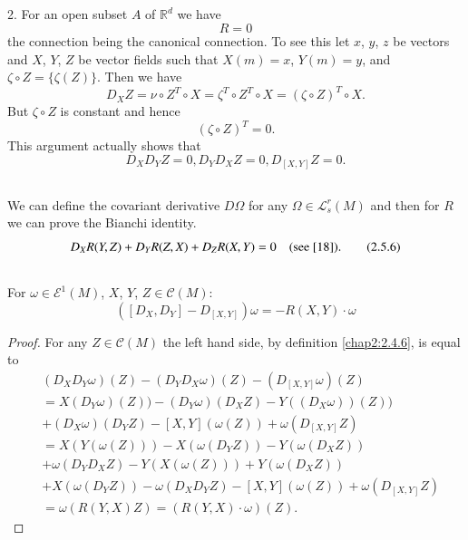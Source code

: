 \subsection{}\label{chap2:2.5.4} 
2. For an open subset $A$ of $\mathbb{R}^{d}$ we have 
$$
R=0
$$
the \pageoriginale connection being the canonical connection. To see
this let $x$, $y$, $z$ be vectors and $X$, $Y$, $Z$ be vector fields
such that $X(m)=x$, $Y(m)=y$, and $\zeta\circ Z=\{\zeta(Z)\}$. Then we
have
$$
D_{X}Z=\nu \circ Z^{T}\circ X=\zeta^{T}\circ Z^{T}\circ X=(\zeta\circ
Z)^{T}\circ X.
$$
But $\zeta\circ Z$ is constant and hence
$$
(\zeta\circ Z)^{T}=0.
$$
This argument actually shows that
$$
D_{X}D_{Y}Z=0, D_{Y}D_{X}Z=0, D_{[X,Y]}Z=0.
$$


\setcounter{subsection}{4}
\subsection{}\label{chap2:2.5.5}

\begin{note*}
We can define the covariant derivative $D\Omega$ for any
$\Omega\in\mathscr{L}^{r}_{s}(M)$ and then for $R$ we can prove the
Bianchi identity.
\begin{equation*}
D_{X}R(Y,Z)+D_{Y}R(Z,X)+D_{Z}R(X,Y)=0\quad\text{(see
  \cite{18}).}\tag{2.5.6}\label{chap2:2.5.6} 
\end{equation*}
\end{note*}

\setcounter{subsection}{6}
\subsection{}\label{chap2:2.5.7}

\begin{lemma*}
For $\omega\in \mathscr{E}^{1}(M)$, $X$, $Y$, $Z\in \mathscr{C}(M)$:
$$
([D_{X},D_{Y}]-D_{[X,Y]})\omega=-R(X,Y)\cdot \omega
$$
\end{lemma*}

\begin{proof}
For any $Z\in \mathscr{C}(M)$ the left hand side, by definition
\ref{chap2:2.4.6}, is equal to
\begin{align*}
& (D_{X}D_{Y}\omega)(Z)-(D_{Y}D_{X}\omega)(Z)-(D_{[X,Y]}\omega)(Z)\\
& =X(D_{Y}\omega)(Z))-(D_{Y}\omega)(D_{X}Z)-Y((D_{X}\omega))(Z))\\
& +(D_{X}\omega)(D_{Y}Z)-[X,Y](\omega(Z))+\omega(D_{[X,Y]}Z)\\
& =X(Y(\omega(Z)))-X(\omega(D_{Y}Z))-Y(\omega(D_{X}Z))\\
& +\omega(D_{Y}D_{X}Z)-Y(X(\omega(Z)))+Y(\omega(D_{X}Z))\\
&
  +X(\omega(D_{Y}Z))-\omega(D_{X}D_{Y}Z)-[X,Y](\omega(Z))+\omega(D_{[X,Y]}Z)\\
& =\omega(R(Y,X)Z)=(R(Y,X)\cdot\omega)(Z).
\end{align*}\pageoriginale
\end{proof}

